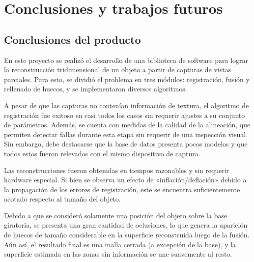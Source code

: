 \chapter{Conclusiones y trabajos futuros}

\section{Conclusiones del producto}
	En este proyecto se realizó el desarrollo de una biblioteca de software para lograr
	la reconstrucción tridimensional de un objeto a partir de capturas de
	vistas parciales.
	Para esto, se dividió el problema en tres módulos: registración, fusión y
	rellenado de huecos, y se implementaron diversos algoritmos.

	A pesar de que las capturas no contenían información de textura,
	el algoritmo de registración fue exitoso en casi todos los casos sin requerir
	ajustes a su conjunto de parámetros.
	Además, se cuenta con medidas de la calidad de la alineación,
	que permiten detectar fallas durante esta etapa sin requerir de una inspección visual.
	Sin embargo, debe destacarse que la base de datos presenta pocos modelos
	y que todos estos fueron relevados con el mismo dispositivo de captura.


	Las reconstrucciones fueron obtenidas en tiempos razonables y sin requerir hardware especial.
	Si bien se observa un efecto de «inflación/deflación» debido a la propagación de los errores de registración,
	este se encuentra suficientemente acotado respecto al tamaño del objeto.

	Debido a que se consideró solamente una posición del objeto sobre la base giratoria,
	se presenta una gran cantidad de oclusiones,
	lo que genera la aparición de huecos de tamaño considerable
	en la superficie reconstruida luego de la fusión.
	Aún así, el resultado final es una malla cerrada (a excepción de la base), y la
	superficie estimada en las zonas sin información se une suavemente al resto.

